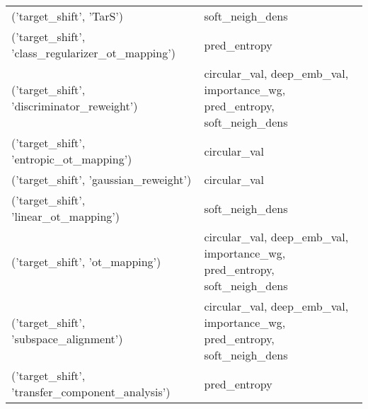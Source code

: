 \begin{tabular}{ll}
 ('target\_shift', 'TarS')                            & soft\_neigh\_dens                                                          \\
 ('target\_shift', 'class\_regularizer\_ot\_mapping')    & pred\_entropy                                                             \\
 ('target\_shift', 'discriminator\_reweight')          & circular\_val, deep\_emb\_val, importance\_wg, pred\_entropy, soft\_neigh\_dens \\
 ('target\_shift', 'entropic\_ot\_mapping')             & circular\_val                                                             \\
 ('target\_shift', 'gaussian\_reweight')               & circular\_val                                                             \\
 ('target\_shift', 'linear\_ot\_mapping')               & soft\_neigh\_dens                                                          \\
 ('target\_shift', 'ot\_mapping')                      & circular\_val, deep\_emb\_val, importance\_wg, pred\_entropy, soft\_neigh\_dens \\
 ('target\_shift', 'subspace\_alignment')              & circular\_val, deep\_emb\_val, importance\_wg, pred\_entropy, soft\_neigh\_dens \\
 ('target\_shift', 'transfer\_component\_analysis')     & pred\_entropy                                                             \\
\hline
\end{tabular}